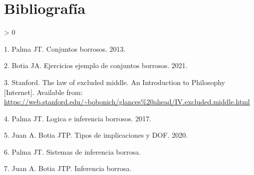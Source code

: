 \documentclass[
]{article}
\newlength{\cslhangindent}
\newenvironment{CSLReferences}[2] %
 {%
  \setlength{\parindent}{0pt}
  \ifodd #1 \everypar{\setlength{\hangindent}{\cslhangindent}}\ignorespaces\fi
  \ifnum #2 > 0
  \setlength{\parskip}{#2\baselineskip}
  \fi
 }%
 {}
\begin{document}
\newpage

\hypertarget{bibliografuxeda}{%
\section{Bibliografía}\label{bibliografuxeda}}

\hypertarget{refs}{}
\begin{CSLReferences}{0}{0}
\leavevmode\hypertarget{ref-PalmaConjuntosBorrosos}{}%
1. Palma JT. Conjuntos borrosos. 2013.

\leavevmode\hypertarget{ref-BotiaConjuntosBorrosos}{}%
2. Botia JA. Ejercicios ejemplo de conjuntos borrosos. 2021.

\leavevmode\hypertarget{ref-Stanford}{}%
3. Stanford. The law of excluded middle. An Introduction to Philosophy
{[}Internet{]}. Available from:
\url{https://web.stanford.edu/~bobonich/glances\%20ahead/IV.excluded.middle.html}

\leavevmode\hypertarget{ref-PalmaLogicaBorrosa}{}%
4. Palma JT. Logica e inferencia borrosos. 2017.

\leavevmode\hypertarget{ref-BotiaPalmaImplicaciones}{}%
5. Juan A. Botia JTP. Tipos de implicaciones y DOF. 2020.

\leavevmode\hypertarget{ref-PalmaInferencia}{}%
6. Palma JT. Sistemas de inferencia borrosa.

\leavevmode\hypertarget{ref-BotiaPalmaInferencia}{}%
7. Juan A. Botia JTP. Inferencia borrosa.

\end{CSLReferences}
\end{document}
